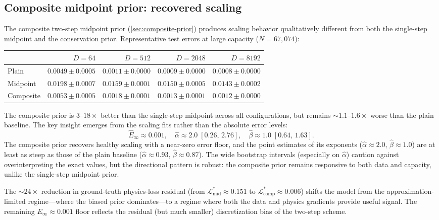\documentclass[11pt]{article}
\begin{document}
\subsection{Composite midpoint prior: recovered scaling}
\label{sec:results-composite}

The composite two-step midpoint prior (\cref{sec:composite-prior}) produces scaling behavior qualitatively different from both the single-step midpoint and the conservation prior.
Representative test errors at large capacity ($N = 67{,}074$):

\begin{center}
\small
\begin{tabular}{lrrrr}
\toprule
& $D = 64$ & $D = 512$ & $D = 2048$ & $D = 8192$ \\
\midrule
Plain       & $0.0049 \pm 0.0005$ & $0.0011 \pm 0.0000$ & $0.0009 \pm 0.0000$ & $0.0008 \pm 0.0000$ \\
Midpoint    & $0.0198 \pm 0.0007$ & $0.0159 \pm 0.0001$ & $0.0150 \pm 0.0005$ & $0.0143 \pm 0.0002$ \\
Composite   & $0.0053 \pm 0.0005$ & $0.0018 \pm 0.0001$ & $0.0013 \pm 0.0001$ & $0.0012 \pm 0.0000$ \\
\bottomrule
\end{tabular}
\end{center}

The composite prior is $3$--$18\times$ better than the single-step midpoint across all configurations, but remains $\sim\!1.1$--$1.6\times$ worse than the plain baseline.
The key insight emerges from the scaling fits rather than the absolute error levels:
\[
\hat{E}_\infty \approx 0.001,\quad \hat{\alpha} \approx 2.0\;[0.26,\, 2.76],\quad \hat{\beta} \approx 1.0\;[0.64,\, 1.63].
\]
The composite prior recovers healthy scaling with a near-zero error floor, and the point estimates of its exponents ($\hat{\alpha} \approx 2.0$, $\hat{\beta} \approx 1.0$) are at least as steep as those of the plain baseline ($\hat{\alpha} \approx 0.93$, $\hat{\beta} \approx 0.87$).
The wide bootstrap intervals (especially on $\hat{\alpha}$) caution against overinterpreting the exact values, but the directional pattern is robust: the composite prior remains responsive to both data and capacity, unlike the single-step midpoint prior.

The $\sim\!24\times$ reduction in ground-truth physics-loss residual (from $\mathcal{L}_{\mathrm{mid}}^* \approx 0.151$ to $\mathcal{L}_{\mathrm{comp}}^* \approx 0.006$) shifts the model from the approximation-limited regime---where the biased prior dominates---to a regime where both the data and physics gradients provide useful signal.
The remaining $E_\infty \approx 0.001$ floor reflects the residual (but much smaller) discretization bias of the two-step scheme.
\end{document}
